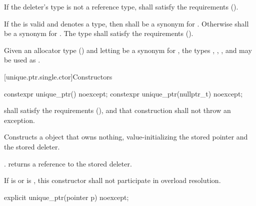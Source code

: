 \pnum
If the deleter's type  is not a reference type,  shall satisfy
the  requirements ().

\pnum
If the   is valid and denotes a
type, then  shall be a synonym for . Otherwise
 shall be a synonym for . The type  shall
satisfy the  requirements ().

\pnum
\begin{example} Given an allocator type  () and
letting  be a synonym for , the types ,
, , and 
may be used as . \end{example}

[unique.ptr.single.ctor]{Constructors}

%
\begin{itemdecl}
constexpr unique_ptr() noexcept;
constexpr unique_ptr(nullptr_t) noexcept;
\end{itemdecl}

\begin{itemdescr}
\pnum
\requires {} shall
satisfy the  requirements (),
and that construction shall not throw an exception.

\pnum
\effects Constructs a  object that owns
nothing, value-initializing the stored pointer and the stored deleter.

\pnum
\ensures {}. 
returns a reference to the stored deleter.

\pnum
\remarks If  is  or
 is ,
this constructor shall not participate in overload resolution.
\end{itemdescr}

%
\begin{itemdecl}
explicit unique_ptr(pointer p) noexcept;
\end{itemdecl}


